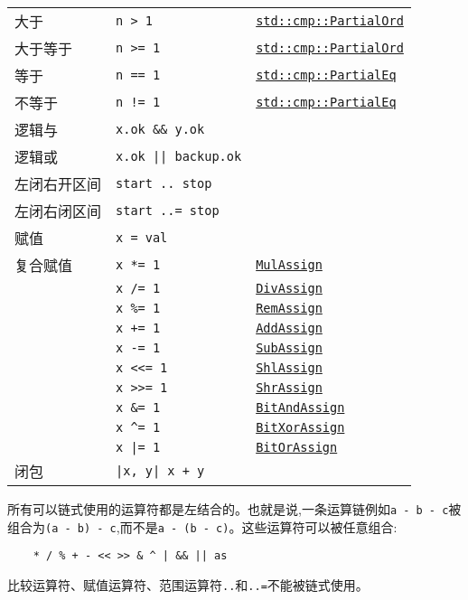 \begin{longtable}{p{}p{}p{}}
    大于        & \texttt{n > 1}    & \texttt{\hyperref[cmp]{std::cmp::PartialOrd}} \\
    大于等于    & \texttt{n >= 1}   & \texttt{\hyperref[cmp]{std::cmp::PartialOrd}} \\
    等于        & \texttt{n == 1}   & \texttt{\hyperref[equal]{std::cmp::PartialEq}} \\
    不等于      & \texttt{n != 1}   & \texttt{\hyperref[equal]{std::cmp::PartialEq}} \\   
    \hline
    逻辑与      & \texttt{x.ok \&\& y.ok}       & \\
    \cline{1-2}
    逻辑或      & \texttt{x.ok || backup.ok}    & \\
    \cline{1-2}
    左闭右开区间 & \texttt{start .. stop}   & \\
    左闭右闭区间 & \texttt{start ..= stop}  & \\
    \cline{1-2}
    赋值        & \texttt{x = val}  & \\
    复合赋值    & \texttt{x *= 1}   & \texttt{\hyperref[assign]{MulAssign}} \\
                & \texttt{x /= 1}   & \texttt{\hyperref[assign]{DivAssign}} \\
                & \texttt{x \%= 1}  & \texttt{\hyperref[assign]{RemAssign}} \\
                & \texttt{x += 1}   & \texttt{\hyperref[assign]{AddAssign}} \\
                & \texttt{x -= 1}   & \texttt{\hyperref[assign]{SubAssign}} \\
                & \texttt{x <<= 1}  & \texttt{\hyperref[assign]{ShlAssign}} \\
                & \texttt{x >>= 1}  & \texttt{\hyperref[assign]{ShrAssign}} \\
                & \texttt{x \&= 1}  & \texttt{\hyperref[assign]{BitAndAssign}} \\
                & \texttt{x \^{}= 1}& \texttt{\hyperref[assign]{BitXorAssign}} \\
                & \texttt{x |= 1}   & \texttt{\hyperref[assign]{BitOrAssign}} \\
    \cline{1-2}
    闭包        & \texttt{|x, y| x + y} & \\
\end{longtable}

所有可以链式使用的运算符都是左结合的。也就是说,一条运算链例如\texttt{a - b - c}被组合为\texttt{(a - b) - c},而不是\texttt{a - (b - c)}。这些运算符可以被任意组合:
\begin{verbatim}
    * / % + - << >> & ^ | && || as
\end{verbatim}
比较运算符、赋值运算符、范围运算符\texttt{..}和\texttt{..=}不能被链式使用。

